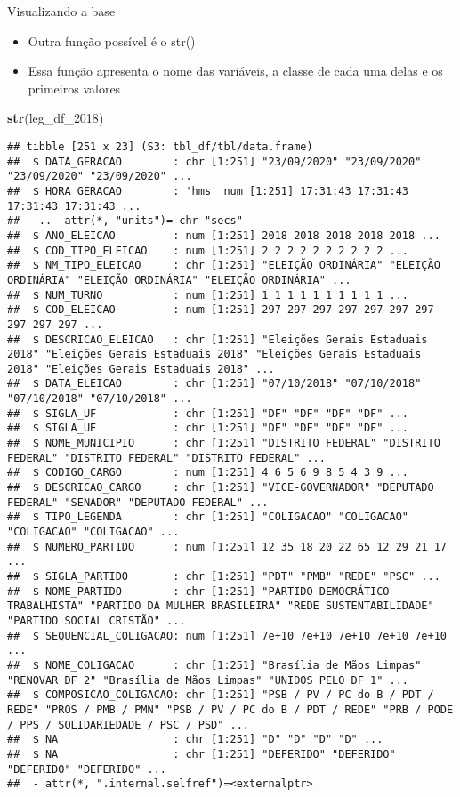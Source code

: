 \documentclass[
  10pt,
  ignorenonframetext,
]{beamer}
\newenvironment{Shaded}{\begin{snugshade}}{\end{snugshade}}
\newcommand{\DecValTok}[1]{\textcolor[rgb]{0.00,0.00,0.81}{#1}}
\newcommand{\KeywordTok}[1]{\textcolor[rgb]{0.13,0.29,0.53}{\textbf{#1}}}
\newcommand{\NormalTok}[1]{#1}
\providecommand{\tightlist}{%
  \setlength{\itemsep}{0pt}\setlength{\parskip}{0pt}}
\begin{document}
\begin{frame}[fragile]{Visualizando a base}
\protect\hypertarget{visualizando-a-base-4}{}
\begin{itemize}
\tightlist
\item
  Outra função possível é o str()
\item
  Essa função apresenta o nome das variáveis, a classe de cada uma delas
  e os primeiros valores
\end{itemize}

\begin{Shaded}
\begin{Highlighting}[]
\KeywordTok{str}\NormalTok{(leg\_df\_}\DecValTok{2018}\NormalTok{)}
\end{Highlighting}
\end{Shaded}

\begin{verbatim}
## tibble [251 x 23] (S3: tbl_df/tbl/data.frame)
##  $ DATA_GERACAO        : chr [1:251] "23/09/2020" "23/09/2020" "23/09/2020" "23/09/2020" ...
##  $ HORA_GERACAO        : 'hms' num [1:251] 17:31:43 17:31:43 17:31:43 17:31:43 ...
##   ..- attr(*, "units")= chr "secs"
##  $ ANO_ELEICAO         : num [1:251] 2018 2018 2018 2018 2018 ...
##  $ COD_TIPO_ELEICAO    : num [1:251] 2 2 2 2 2 2 2 2 2 2 ...
##  $ NM_TIPO_ELEICAO     : chr [1:251] "ELEIÇÃO ORDINÁRIA" "ELEIÇÃO ORDINÁRIA" "ELEIÇÃO ORDINÁRIA" "ELEIÇÃO ORDINÁRIA" ...
##  $ NUM_TURNO           : num [1:251] 1 1 1 1 1 1 1 1 1 1 ...
##  $ COD_ELEICAO         : num [1:251] 297 297 297 297 297 297 297 297 297 297 ...
##  $ DESCRICAO_ELEICAO   : chr [1:251] "Eleições Gerais Estaduais 2018" "Eleições Gerais Estaduais 2018" "Eleições Gerais Estaduais 2018" "Eleições Gerais Estaduais 2018" ...
##  $ DATA_ELEICAO        : chr [1:251] "07/10/2018" "07/10/2018" "07/10/2018" "07/10/2018" ...
##  $ SIGLA_UF            : chr [1:251] "DF" "DF" "DF" "DF" ...
##  $ SIGLA_UE            : chr [1:251] "DF" "DF" "DF" "DF" ...
##  $ NOME_MUNICIPIO      : chr [1:251] "DISTRITO FEDERAL" "DISTRITO FEDERAL" "DISTRITO FEDERAL" "DISTRITO FEDERAL" ...
##  $ CODIGO_CARGO        : num [1:251] 4 6 5 6 9 8 5 4 3 9 ...
##  $ DESCRICAO_CARGO     : chr [1:251] "VICE-GOVERNADOR" "DEPUTADO FEDERAL" "SENADOR" "DEPUTADO FEDERAL" ...
##  $ TIPO_LEGENDA        : chr [1:251] "COLIGACAO" "COLIGACAO" "COLIGACAO" "COLIGACAO" ...
##  $ NUMERO_PARTIDO      : num [1:251] 12 35 18 20 22 65 12 29 21 17 ...
##  $ SIGLA_PARTIDO       : chr [1:251] "PDT" "PMB" "REDE" "PSC" ...
##  $ NOME_PARTIDO        : chr [1:251] "PARTIDO DEMOCRÁTICO TRABALHISTA" "PARTIDO DA MULHER BRASILEIRA" "REDE SUSTENTABILIDADE" "PARTIDO SOCIAL CRISTÃO" ...
##  $ SEQUENCIAL_COLIGACAO: num [1:251] 7e+10 7e+10 7e+10 7e+10 7e+10 ...
##  $ NOME_COLIGACAO      : chr [1:251] "Brasília de Mãos Limpas" "RENOVAR DF 2" "Brasília de Mãos Limpas" "UNIDOS PELO DF 1" ...
##  $ COMPOSICAO_COLIGACAO: chr [1:251] "PSB / PV / PC do B / PDT / REDE" "PROS / PMB / PMN" "PSB / PV / PC do B / PDT / REDE" "PRB / PODE / PPS / SOLIDARIEDADE / PSC / PSD" ...
##  $ NA                  : chr [1:251] "D" "D" "D" "D" ...
##  $ NA                  : chr [1:251] "DEFERIDO" "DEFERIDO" "DEFERIDO" "DEFERIDO" ...
##  - attr(*, ".internal.selfref")=<externalptr>
\end{verbatim}
\end{frame}
\end{document}
